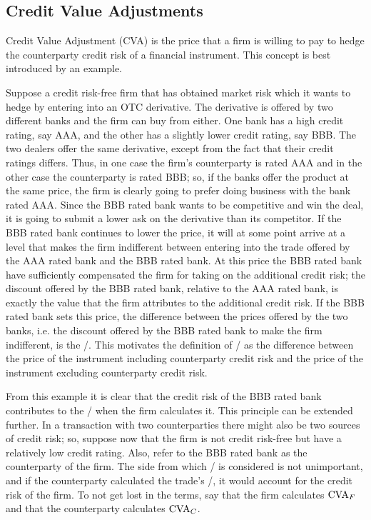 \documentclass[main.tex]{subfiles}
\begin{document}
    \subsection{Credit Value Adjustments}
        Credit Value Adjustment (CVA) is the price that a firm is willing to pay 
        to hedge the counterparty credit risk of a financial instrument.
        This concept is best introduced by an example. 
        
        \begin{example}
        Suppose a credit risk-free firm that has obtained market risk 
        which it wants to hedge by entering into an OTC derivative.
        The derivative is offered by two different banks and the firm can buy from either.
        One bank has a high credit rating, say AAA, and the other has a slightly lower credit rating, say BBB. 
        The two dealers offer the same derivative, except from the fact that their credit ratings differs.
        Thus, in one case the firm's counterparty is rated AAA and in the other case the counterparty is rated BBB;
        so, if the banks offer the product at the same price, 
        the firm is clearly going to prefer doing business with the bank rated AAA.
        Since the BBB rated bank wants to be competitive and win the deal,
        it is going to submit a lower ask on the derivative than its competitor.
        If the BBB rated bank continues to lower the price, it will at some point arrive at a level
        that makes the firm indifferent between entering into the trade 
        offered by the AAA rated bank and the BBB rated bank.
        At this price the BBB rated bank have sufficiently compensated the firm for taking on the additional credit risk;
        the discount offered by the BBB rated bank, relative to the AAA rated bank, is exactly the value that the firm
        attributes to the additional credit risk. 
        If the BBB rated bank sets this price, the difference between the prices offered by the two banks,
        i.e. the discount offered by the BBB rated bank to make the firm indifferent, is the \CVA/.
        This motivates the definition of \CVA/ as the difference between the price of the instrument 
        including counterparty credit risk and the price of the instrument excluding counterparty credit risk.
        \end{example}

        From this example it is clear that the credit risk of the BBB rated bank contributes to the \CVA/
        when the firm calculates it.
        This principle can be extended further.
        In a transaction with two counterparties there might also be two sources of credit risk;
        so, suppose now that the firm is not credit risk-free but have a relatively low credit rating.
        Also, refer to the BBB rated bank as the counterparty of the firm.
        The side from which \CVA/ is considered is not unimportant,
        and if the counterparty calculated the trade's \CVA/, it would account for the credit risk of the firm.
        To not get lost in the terms, say that the firm calculates $\CVA/_{F}$ 
        and that the counterparty calculates $\CVA/_{C}$.
\end{document}
